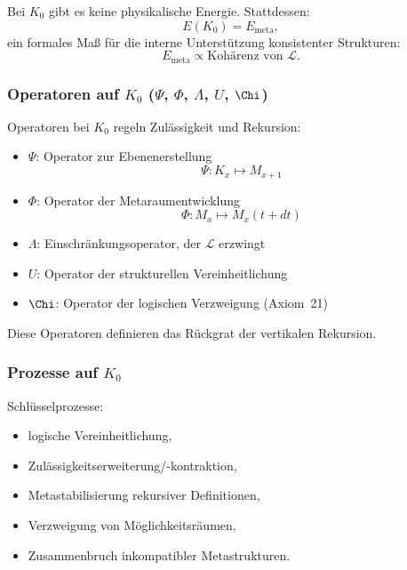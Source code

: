 Bei $K_0$ gibt es keine physikalische Energie.
Stattdessen:
\[
E(K_0) = E_{\mathrm{meta}},
\]
ein formales Maß für die interne Unterstützung konsistenter Strukturen:
\[
E_{\mathrm{meta}} \propto \text{Kohärenz von }\mathcal{L}.
\]

\subsubsection{Operatoren auf \texorpdfstring{$K_0$}{K_0} (\texorpdfstring{$\Psi$}{\Psi}, \texorpdfstring{$\Phi$}{\Phi}, \texorpdfstring{$\Lambda$}{\Lambda}, \texorpdfstring{$U$}{U}, \texorpdfstring{$\Chi$}{\Chi})}

Operatoren bei $K_0$ regeln Zulässigkeit und Rekursion:

\begin{itemize}
    \item $\Psi$: Operator zur Ebenenerstellung
          \[
          \Psi: K_x \mapsto M_{x+1}
          \]
    \item $\Phi$: Operator der Metaraumentwicklung
          \[
          \Phi: M_x \mapsto M_x(t+dt)
          \]
    \item $\Lambda$: Einschränkungsoperator, der $\mathcal{L}$ erzwingt
    \item $U$: Operator der strukturellen Vereinheitlichung
    \item $\Chi$: Operator der logischen Verzweigung (Axiom~21)
\end{itemize}

Diese Operatoren definieren das Rückgrat der vertikalen Rekursion.

\subsubsection{Prozesse auf \texorpdfstring{$K_0$}{K_0}}

Schlüsselprozesse:
\begin{itemize}
    \item logische Vereinheitlichung,
    \item Zulässigkeitserweiterung/-kontraktion,
    \item Metastabilisierung rekursiver Definitionen,
    \item Verzweigung von Möglichkeitsräumen,
    \item Zusammenbruch inkompatibler Metastrukturen.
\end{itemize}

